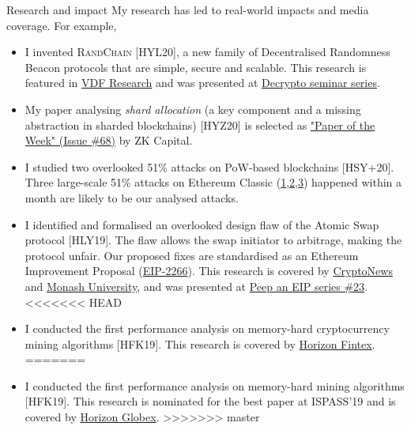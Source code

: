 \documentclass{resume} %
\begin{document}
\begin{rSection}{Research and impact}
    My research has led to real-world impacts and media coverage. For example,
    \begin{itemize}
        \item I invented \textsc{RandChain} [HYL20], a new family of Decentralised Randomness Beacon protocols that are simple, secure and scalable. This research is featured in \href{https://vdfresearch.org/}{VDF Research} and was presented at \href{https://decrypto.org/seminar/}{Decrypto seminar series}.
        \item My paper analysing \emph{shard allocation} (a key component and a missing abstraction in sharded blockchains) [HYZ20] is selected as \href{https://zkcapital.substack.com/}{"Paper of the Week" (Issue \#68)} by ZK Capital.
        \item I studied two overlooked 51\% attacks on PoW-based blockchains [HSY+20]. Three large-scale 51\% attacks on Ethereum Classic (\href{https://news.bitcoin.com/ethereum-classic-suffers-51-attack-again-delisting-risk-amplified}{1},\href{https://decrypt.co/40196/hackers-launch-third-51-attack-on-ethereum-classic-this-month}{2},\href{https://coingeek.com/over-1m-double-spent-in-latest-ethereum-classic-51-attack}{3}) happened within a month are likely to be our analysed attacks.
        \item I identified and formalised an overlooked design flaw of the Atomic Swap protocol [HLY19]. The flaw allows the swap initiator to arbitrage, making the protocol unfair. Our proposed fixes are standardised as an Ethereum Improvement Proposal (\href{https://github.com/ethereum/EIPs/issues/2266}{EIP-2266}). This research is covered by \href{https://cryptonews.com.au/monash-university-researchers-developing-cryptocurrency-transaction-platform}{CryptoNews} and \href{https://www.monash.edu/blockchain/news/to-realise-their-potential,-business-blockchains-must-learn-to-communicate}{Monash University}, and was presented at \href{https://www.youtube.com/watch?v=wwWcfl9N65k}{Peep an EIP series \#23}.
              <<<<<<< HEAD
        \item I conducted the first performance analysis on memory-hard cryptocurrency mining algorithms [HFK19]. This research is covered by \href{https://mediuam.com/@horizonfintex/blockchain-research-bytes-1-9d023e080765}{Horizon Fintex}.
              =======
        \item I conducted the first performance analysis on memory-hard mining algorithms [HFK19]. This research is nominated for the best paper at ISPASS'19 and is covered by \href{https://medium.com/@horizonfintex/blockchain-research-bytes-1-9d023e080765}{Horizon Globex}.
              >>>>>>> master
    \end{itemize}

\end{rSection}
\end{document}
